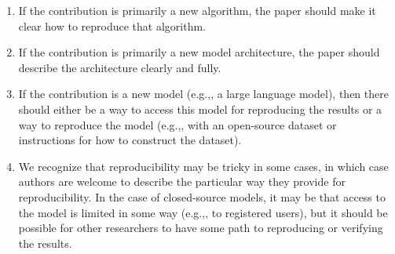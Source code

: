 \documentclass{article}
\theoremstyle{plain}
\theoremstyle{definition}
\theoremstyle{remark}
\begin{document}
\begin{enumerate}
\begin{itemize}
        \begin{enumerate}
            \item If the contribution is primarily a new algorithm, the paper should make it clear how to reproduce that algorithm.
            \item If the contribution is primarily a new model architecture, the paper should describe the architecture clearly and fully.
            \item If the contribution is a new model (e.g.,, a large language model), then there should either be a way to access this model for reproducing the results or a way to reproduce the model (e.g.,, with an open-source dataset or instructions for how to construct the dataset).
            \item We recognize that reproducibility may be tricky in some cases, in which case authors are welcome to describe the particular way they provide for reproducibility. In the case of closed-source models, it may be that access to the model is limited in some way (e.g.,, to registered users), but it should be possible for other researchers to have some path to reproducing or verifying the results.
        \end{enumerate}
    \end{itemize}



\end{enumerate}
\end{document}
